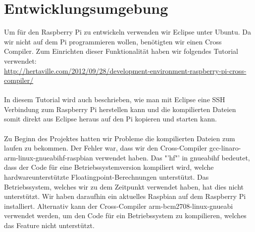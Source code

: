 \section{Entwicklungsumgebung}

Um für den Raspberry Pi zu entwickeln verwenden wir Eclipse unter Ubuntu. Da wir nicht auf dem Pi programmieren wollen, benötigten wir einen Cross Compiler. Zum Einrichten dieser Funktionalität haben wir folgendes Tutorial verwendet:\\
\href{http://hertaville.com/2012/09/28/development-environment-raspberry-pi-cross-compiler/}{http://hertaville.com/2012/09/28/development-environment-raspberry-pi-cross-compiler/}\\
\\
In diesem Tutorial wird auch beschrieben, wie man mit Eclipse eine SSH Verbindung zum Raspberry Pi herstellen kann und die kompilierten Dateien somit direkt aus Eclipse heraus auf den Pi kopieren und starten kann.\\
\\
Zu Beginn des Projektes hatten wir Probleme die kompilierten Dateien zum laufen zu bekommen. Der Fehler war, dass wir den Cross-Compiler gcc-linaro-arm-linux-gnueabihf-raspbian verwendet haben. Das "'hf"' in gnueabihf bedeutet, dass der Code für eine Betriebssystemversion kompiliert wird, welche hardwareunterstützte Floatingpoint-Berechnungen unterstützt. Das Betriebssystem, welches wir zu dem Zeitpunkt verwendet haben, hat dies nicht unterstützt. Wir haben daraufhin ein aktuelles Raspbian auf dem Raspberry Pi installiert. Alternativ kann der Cross-Compiler arm-bcm2708-linux-gnueabi verwendet werden, um den Code für ein Betriebssystem zu kompilieren, welches das Feature nicht unterstützt.